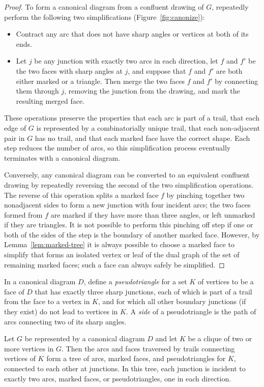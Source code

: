 \documentclass{llncs}
\begin{document}
\begin{proof}
To form a canonical diagram from a confluent drawing of $G$, repeatedly perform the following two simplifications (Figure~\ref{fig:canonize}):
\begin{itemize}
\item Contract any arc that does not have sharp angles or vertices at both of its ends.
\item Let $j$ be any junction with exactly two arcs in each direction, let $f$ and $f'$ be the two faces with sharp angles at $j$, and suppose that $f$ and $f'$ are both either marked or a triangle. Then merge the two faces $f$ and $f'$ by connecting them through $j$, removing the junction from the drawing, and mark the resulting merged face.
\end{itemize}
These operations preserve the properties that each arc is part of a trail, that each edge of $G$ is represented by a combinatorially unique trail, that each non-adjacent pair in $G$ has no trail, and that each marked face have the correct shape. Each step reduces the number of arcs, so this simplification process eventually terminates with a canonical diagram.

Conversely, any canonical diagram can be converted to an equivalent confluent drawing by repeatedly reversing the second of the two simplification operations. The reverse of this operation splits a marked face $f$ by pinching together two nonadjacent sides to form a new junction with four incident arcs; the two faces formed from $f$ are marked if they have more than three angles, or left unmarked if they are triangles. It is not possible to perform this pinching off step if one or both of the sides of the step is the boundary of another marked face. However, by Lemma~\ref{lem:marked-tree} it is always possible to choose a marked face to simplify that forms an isolated vertex or leaf of the dual graph of the set of remaining marked faces; such a face can always safely be simplified.
\end{proof}

In a canonical diagram $D$, define a \emph{pseudotriangle} for a set $K$ of vertices to be a face of $D$ that has exactly three sharp junctions, each of which is part of a trail from the face to a vertex in $K$, and for which all other boundary junctions (if they exist) do not lead to vertices in $K$. A \emph{side} of a pseudotriangle is the path of arcs connecting two of its sharp angles.

\begin{lemma}
\label{lem:candy-clique}
Let $G$ be represented by a canonical diagram $D$ and let $K$ be a clique of two or more vertices in $G$.
Then the arcs and faces traversed by trails connecting vertices of $K$ form a tree of arcs, marked faces, and pseudotriangles for $K$, connected to each other at junctions. In this tree, each junction is incident to exactly two arcs, marked faces, or pseudotriangles, one in each direction.
\end{lemma}
\end{document}
